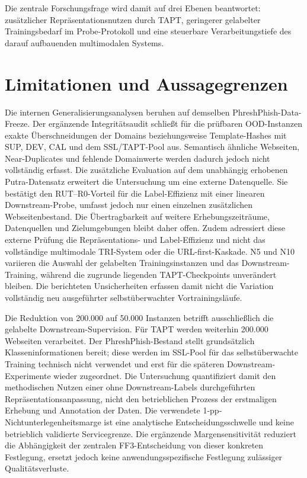 Die zentrale Forschungsfrage wird damit auf drei Ebenen beantwortet: zusätzlicher
Repräsentationsnutzen durch TAPT, geringerer gelabelter Trainingsbedarf im Probe-Protokoll
und eine steuerbare Verarbeitungstiefe des darauf aufbauenden multimodalen Systems.


\section{Limitationen und Aussagegrenzen}

Die internen Generalisierungsanalysen beruhen auf demselben PhreshPhish-Data-Freeze.
Der ergänzende Integritätsaudit schließt für die prüfbaren OOD-Instanzen exakte
Überschneidungen der Domains beziehungsweise Template-Hashes mit SUP, DEV, CAL und
dem SSL/TAPT-Pool aus. Semantisch ähnliche Webseiten, Near-Duplicates und fehlende
Domainwerte werden dadurch jedoch nicht vollständig erfasst. Die zusätzliche Evaluation auf dem unabhängig erhobenen Putra-Datensatz erweitert die
Untersuchung um eine externe Datenquelle. Sie bestätigt den RUT--R0-Vorteil für die
Label-Effizienz mit einer linearen Downstream-Probe, umfasst jedoch nur einen einzelnen
zusätzlichen Webseitenbestand. Die Übertragbarkeit auf weitere Erhebungszeiträume,
Datenquellen und Zielumgebungen bleibt daher offen. Zudem adressiert diese externe
Prüfung die Repräsentations- und Label-Effizienz und nicht das vollständige multimodale
TRI-System oder die URL-first-Kaskade. N5 und N10 variieren die Auswahl der gelabelten Trainingsinstanzen und das
Downstream-Training, während die zugrunde liegenden TAPT-Checkpoints unverändert bleiben.
Die berichteten Unsicherheiten erfassen damit nicht die Variation vollständig neu ausgeführter
selbstüberwachter Vortrainingsläufe.

Die Reduktion von 200.000 auf 50.000 Instanzen betrifft ausschließlich die gelabelte
Downstream-Supervision. Für TAPT werden weiterhin 200.000 Webseiten verarbeitet. Der
PhreshPhish-Bestand stellt grundsätzlich Klasseninformationen bereit; diese werden im
SSL-Pool für das selbstüberwachte Training technisch nicht verwendet und erst für die
späteren Downstream-Experimente wieder zugeordnet. Die Untersuchung quantifiziert damit
den methodischen Nutzen einer ohne Downstream-Labels durchgeführten
Repräsentationsanpassung, nicht den betrieblichen Prozess der erstmaligen Erhebung und
Annotation der Daten. Die verwendete 1-pp-Nichtunterlegenheitsmarge ist eine analytische Entscheidungsschwelle
und keine betrieblich validierte Servicegrenze. Die ergänzende Margensensitivität reduziert
die Abhängigkeit der zentralen FF3-Entscheidung von dieser konkreten Festlegung, ersetzt
jedoch keine anwendungsspezifische Festlegung zulässiger Qualitätsverluste.

